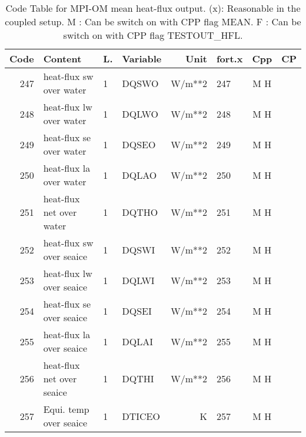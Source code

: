 \begin{table}
\begin{footnotesize}
\begin{tabular}{r|l|l|l|r|l|c|c}
Code & Content  		       & L.    &  Variable	&   Unit    &	fort.x &  Cpp  &    CP   \\ \hline
247  & heat-flux sw over water	       &  1    &  DQSWO 	&   W/m**2  &	247    &  M H  &	  \\
248  & heat-flux lw over water	       &  1    &  DQLWO 	&   W/m**2  &	248    &  M H  &	  \\
249  & heat-flux se over water	       &  1    &  DQSEO 	&   W/m**2  &	249    &  M H  &	  \\
250  & heat-flux la over water	       &  1    &  DQLAO 	&   W/m**2  &	250    &  M H  &	  \\
251  & heat-flux net over water         &  1    &  DQTHO 	&   W/m**2  &	251    &  M H  &	  \\
252  & heat-flux sw over seaice         &  1    &  DQSWI 	&   W/m**2  &	252    &  M H  &	  \\
253  & heat-flux lw over seaice         &  1    &  DQLWI 	&   W/m**2  &	253    &  M H  &	  \\
254  & heat-flux se over seaice         &  1    &  DQSEI 	&   W/m**2  &	254    &  M H  &	  \\
255  & heat-flux la over seaice         &  1    &  DQLAI 	&   W/m**2  &	255    &  M H  &	  \\
256  & heat-flux net over seaice        &  1    &  DQTHI 	&   W/m**2  &	256    &  M H  &	  \\
257  & Equi. temp over seaice	       &  1    &  DTICEO	&   K	    &	257    &  M H  &	  \\  

\end{tabular}
\end{footnotesize}
\caption{Code Table for MPI-OM mean heat-flux output. \newline
(x): Reasonable in the coupled setup.\newline
 M : Can be switch on with CPP flag MEAN.\newline
 F : Can be switch on with CPP flag TESTOUT\_HFL.}
\label{tb:diagnostic:output:meanheat}
\end{table}



